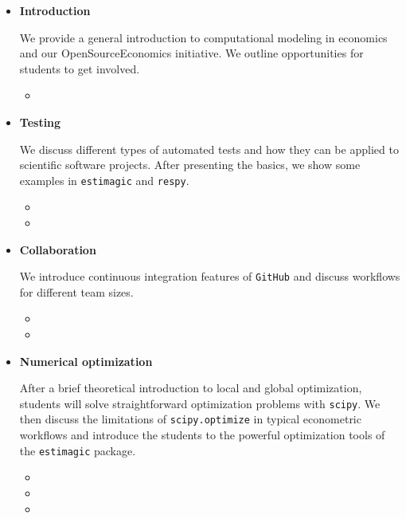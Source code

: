 \begin{itemize}

\item \textbf{Introduction}

We provide a general introduction to computational modeling in economics and our OpenSourceEconomics initiative. We outline opportunities for students to get involved.

\begin{itemize}
  \item {}
\end{itemize}

\item \textbf{Testing}

We discuss different types of automated tests and how they can be applied to scientific software projects. After presenting the basics, we show some examples in \verb+estimagic+ and \verb+respy+.

\begin{itemize}
  \item {}
  \item {}
\end{itemize}


\item \textbf{Collaboration}

We introduce continuous integration features of \verb+GitHub+ and discuss workflows for different team sizes.

\begin{itemize}
  \item {}
  \item {}
\end{itemize}

\item \textbf{Numerical optimization}

After a brief theoretical introduction to local and global optimization, students will solve straightforward optimization problems with \verb+scipy+. We then discuss the limitations of \verb+scipy.optimize+ in typical econometric workflows and introduce the students to the powerful optimization tools of the \verb+estimagic+ package.

\begin{itemize}
  \item {}
  \item {}
  \item {}
\end{itemize}


\end{itemize}

